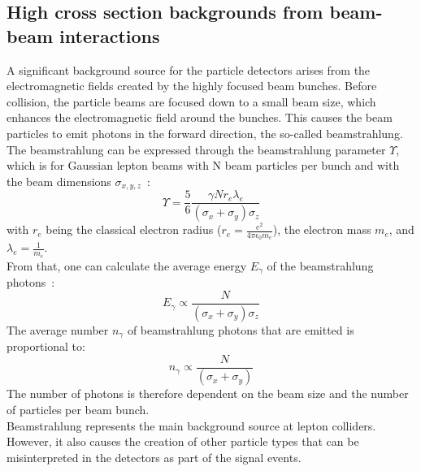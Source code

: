 \subsection{High cross section backgrounds from beam-beam interactions}
\label{BeamBeam}
A significant background source for the particle detectors arises from the electromagnetic fields created by the highly focused beam bunches.
Before collision, the particle beams are focused down to a small beam size, which enhances the electromagnetic field around the bunches.
This causes the beam particles to emit photons in the forward direction, the so-called beamstrahlung.
\\The beamstrahlung can be expressed through the beamstrahlung parameter $\Upsilon$, which is for Gaussian lepton beams with N beam particles per bunch and with the beam dimensions $\sigma_{x,y,z}$~\cite{PairBkg_cross_section, AndreSailer}:
\begin{equation}
 \Upsilon=\frac{5}{6}\frac{\gamma N r_e \lambda_e}{(\sigma_x+\sigma_y)\sigma_z}
\end{equation}
with $r_e$ being the classical electron radius ($r_e = \frac{e^2}{4\pi \epsilon_0 m_e}$), the electron mass $m_e$, and $\lambda_e=\frac{1}{m_e}$.
\\From that, one can calculate the average energy $E_{\gamma}$ of the beamstrahlung photons~\cite[p. 77]{Beamstrahlung_CLIC}:
\begin{equation}
 E_{\gamma} \propto \frac{N}{(\sigma_x+\sigma_y)\sigma_z}
 \label{eq:pair_energy}
\end{equation}
The average number $n_{\gamma}$ of beamstrahlung photons that are emitted is proportional to:
\begin{equation}
 n_{\gamma} \propto \frac{N}{(\sigma_x+\sigma_y)}
 \label{eq:pair_number}
\end{equation}
The number of photons is therefore dependent on the beam size and the number of particles per beam bunch.
\\Beamstrahlung represents the main background source at lepton colliders.
However, it also causes the creation of other particle types that can be misinterpreted in the detectors as part of the signal events.


